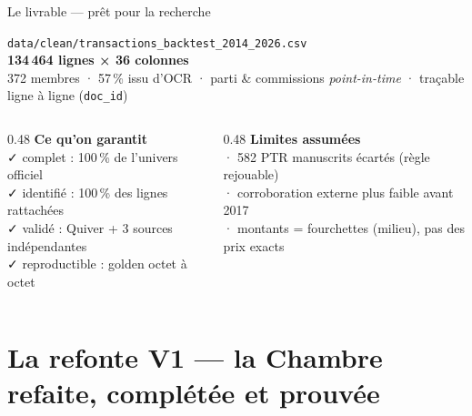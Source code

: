 \documentclass[11pt,aspectratio=169]{beamer}
\newcommand{\co}[1]{\texttt{#1}}
\begin{document}
\begin{frame}{Le livrable — prêt pour la recherche}
  \centering
  \colorbox{helec}{\parbox{0.82\textwidth}{\footnotesize\color{white}\centering\vspace{1.5mm}
    \texttt{\small data/clean/transactions\_backtest\_2014\_2026.csv}\\[1.2mm]
    {\large\textbf{134\,464 lignes × 36 colonnes}}\\[0.8mm]
    372 membres · 57\,\% issu d'OCR · parti \& commissions \emph{point-in-time} ·
    traçable ligne à ligne (\co{doc\_id})\vspace{1.5mm}}}

  \vspace{5mm}
  \begin{columns}[T]
    \begin{column}{0.48\textwidth}
      {\footnotesize\textbf{Ce qu'on garantit}}\\[1mm]
      {\scriptsize
      ✓ complet : 100\,\% de l'univers officiel\\
      ✓ identifié : 100\,\% des lignes rattachées\\
      ✓ validé : Quiver + 3 sources indépendantes\\
      ✓ reproductible : golden octet à octet}
    \end{column}
    \begin{column}{0.48\textwidth}
      {\footnotesize\textbf{Limites assumées}}\\[1mm]
      {\scriptsize
      · 582 PTR manuscrits écartés (règle rejouable)\\
      · corroboration externe plus faible avant 2017\\
      · montants = fourchettes (milieu), pas des prix exacts}
    \end{column}
  \end{columns}
\end{frame}

\appendix

\section{La refonte V1 — la Chambre refaite, complétée et prouvée}
\end{document}
